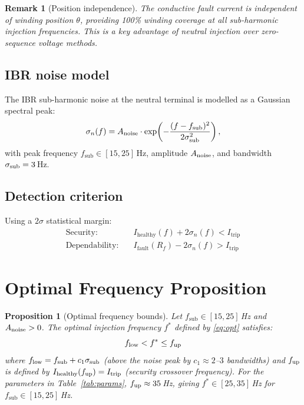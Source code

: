 \documentclass[11pt,a4paper]{article}
\newtheorem{proposition}{Proposition}
\newtheorem{remark}{Remark}
\newcommand{\Ihealthy}{I_{\mathrm{healthy}}}
\newcommand{\Ifault}{I_{\mathrm{fault}}}
\newcommand{\Itrip}{I_{\mathrm{trip}}}
\newcommand{\sigman}{\sigma_n}
\newcommand{\fopt}{f^*}
\newcommand{\fsub}{f_{\mathrm{sub}}}
\begin{document}
\begin{remark}[Position independence]
  The conductive fault current is independent of winding position $\theta$,
  providing 100\% winding coverage at all sub-harmonic injection frequencies.
  This is a key advantage of neutral injection over zero-sequence voltage
  methods.
\end{remark}

\subsection{IBR noise model}
\label{sec:noise}

The IBR sub-harmonic noise at the neutral terminal is modelled as a Gaussian
spectral peak:
\begin{equation}
  \sigman(f) = A_{\rm noise} \cdot \exp\!\left(-\frac{(f - \fsub)^2}{2\sigma_{\rm sub}^2}\right),
  \label{eq:noise}
\end{equation}
with peak frequency $\fsub \in [15, 25]$\,Hz, amplitude $A_{\rm noise}$, and
bandwidth $\sigma_{\rm sub} = 3$\,Hz.

\subsection{Detection criterion}
\label{sec:criterion}

Using a $2\sigma$ statistical margin:
\begin{align}
  \text{Security:}\quad &  \Ihealthy(f) + 2\sigman(f) < \Itrip
  \label{eq:security} \\
  \text{Dependability:}\quad & \Ifault(R_f) - 2\sigman(f) > \Itrip
  \label{eq:depend}
\end{align}

\section{Optimal Frequency Proposition}
\label{sec:proposition}

\begin{proposition}[Optimal frequency bounds]
  \label{prop:fopt}
  Let $\fsub \in [15, 25]$\,Hz and $A_{\rm noise} > 0$.  The optimal injection
  frequency $\fopt$ defined by \eqref{eq:opt} satisfies:
  \begin{equation}
    f_{\rm low} < \fopt \leq f_{\rm up}
    \label{eq:bounds}
  \end{equation}
  where $f_{\rm low} = \fsub + c_1 \sigma_{\rm sub}$ (above the noise peak by
  $c_1 \approx 2$--$3$ bandwidths) and $f_{\rm up}$ is defined by
  $\Ihealthy(f_{\rm up}) = \Itrip$ (security crossover frequency).  For the
  parameters in Table~\ref{tab:params}, $f_{\rm up} \approx 35$\,Hz, giving
  $\fopt \in [25, 35]$\,Hz for $\fsub \in [15, 25]$\,Hz.
\end{proposition}
\end{document}
